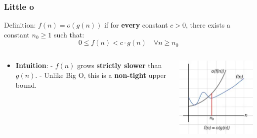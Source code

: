 \documentclass[10pt,aspectratio=43]{beamer}
\begin{document}
\begin{frame}
  \frametitle{Little o}
 
  \begin{block}{Definition:}
        $f(n) = o(g(n))$ if for \textbf{every} constant $c > 0$, there exists a constant $n_0 \geq 1$ such that:
        \[
        0 \leq f(n) < c \cdot g(n) \quad \forall n \geq n_0
        \]
        \end{block}
         \begin{columns}
    \begin{column}{0.7\textwidth}
      \begin{itemize}
        \item \textbf{Intuition}:  
        - $f(n)$ grows \textbf{strictly slower} than $g(n)$.  
        - Unlike Big O, this is a \textbf{non-tight} upper bound.  
        \vspace{5pt}
     \end{itemize}
    \end{column}

    \begin{column}{0.3\textwidth}
      \includegraphics[width=\textwidth]{figures/MasterTheorem/little_o.jpg}
    \end{column}
  \end{columns}
\end{frame}
\end{document}
